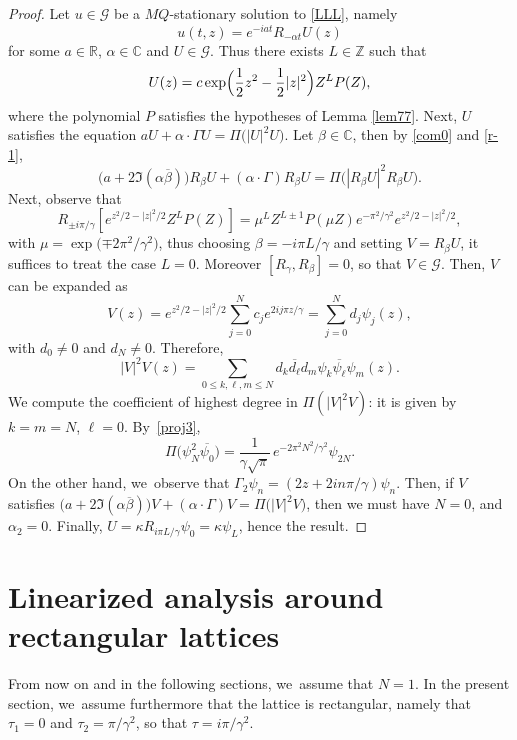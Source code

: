 \documentclass[10pt]{amsart}
\theoremstyle{definition}
\let\EE\exp
\let\dis\relax
\let\ov\overline
\newcommand\C{\mathbb C}
\newcommand\R{\mathbb R}
\newcommand\Z{\mathbb Z}
\begin{document}
\begin{proof}
Let $u \in \mathcal{G}$ be a $MQ$-stationary solution to \eqref{LLL}, namely
\[
u(t,z)=e^{-i at}R_{-\alpha t}U(z)
\]
for some $a \in \R$, $\alpha \in \C$ and $U \in \mathcal{G}$. Thus there exists $L \in \Z$ such that
\[
\dis U(z) =c \EE\Bigl({\frac{1}{2} z^2 - \frac{1}{2} |z|^2}\Bigr) Z^L P(Z),
\]
where the polynomial $P$ satisfies the hypotheses of Lemma \ref{lem77}. Next, $U$ satisfies the equation $a U+\alpha \cdot \Gamma U = \Pi \bigl(|U|^2 U\bigr)$. Let $\beta \in \C$, then by \eqref{com0} and \eqref{r-1},
\[
\bigl(a+2 \Im (\alpha \ov{\beta})\bigr) R_\beta U+(\alpha \cdot \Gamma) R_\beta U = \Pi \bigl(|R_\beta U|^2 R_\beta U\bigr).
\]
Next, observe that
\[
R_{\pm {i\pi}/{\gamma}} \left[ e^{ z^2/2 - |z|^2/2} Z^L P(Z) \right] = \mu^L Z^{L\pm 1} P(\mu Z) e^{- {\pi^2}/{\gamma^2}} e^{ z^2/2 - |z|^2/2},
\]
with $\mu = \EE\bigl({\mp {2\pi^2}/{\gamma^2}}\bigr)$, thus choosing $\beta=- {i\pi}L/\gamma$ and setting $V=R_{\beta}U$, it suffices to treat the case $L=0$. Moreover $[R_{\gamma}, R_{\beta}]=0$, so that $V \in \mathcal{G}$. Then, $V$ can be expanded as
\begin{equation*}
V(z)= e^{ z^2/2- |z|^2/2} \sum_{j=0}^Nc_j e^{{2i j \pi z }/{\gamma} }= \sum_{j=0}^Nd_j \psi_j(z),
\end{equation*}
with $d_0 \neq 0$ and $d_N \neq 0$. Therefore,
\begin{equation*}
|V|^2V(z)= \sum_{0 \leq k, \ell, m \leq N}d_{k}\ov{d_{\ell}}d_{m} \psi_{k}\ov{\psi_{\ell}}\psi_{m}(z).
\end{equation*}
We compute the coefficient of highest degree in $\Pi(|V|^2V)$: it is given by $k=m=N$, $\ell=0$. By~\eqref{proj3},
\[
\Pi\bigl(\psi^2_N\ov{\psi_0}\bigr)=\frac{1}{\gamma \sqrt{\pi}}\,e^{-{2\pi^2N^2}/{\gamma^2}}\psi_{2N}.
\]
On the other hand, we~observe that $\Gamma_2 \psi_n=(2z + {2i n\pi}/{\gamma}) \psi_n $. Then, if $V$ satisfies $\bigl(a+2 \Im (\alpha \ov{\beta})\bigr) V +(\alpha \cdot \Gamma) V = \Pi \bigl(|V|^2 V\bigr)$, then we must have $N=0$, and $\alpha_2=0$. Finally, $U=\kappa R_{{i\pi L }/{\gamma }}\psi_0=\kappa \psi_{L}$, hence the result.
\end{proof}

\section{Linearized analysis around rectangular lattices}\label{rectangular_lattice}
\label{section4}

From now on and in the following sections, we~assume that $N=1$. In the present section, we~assume furthermore that the lattice is rectangular, namely that $\tau_1=0$ and $\tau_2={ \pi}/{\gamma^2}$, so that $\tau= { i\pi}/{\gamma^2}$.
\end{document}
